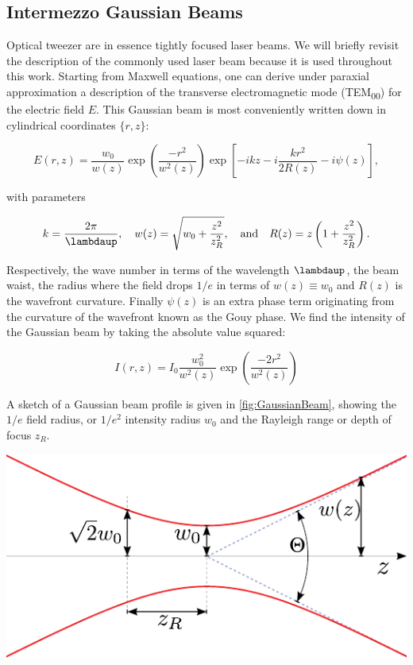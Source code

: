 \mbox{}\par
\begin{mdframed}
    \subsection*{Intermezzo Gaussian Beams}\label{sec:GaussianBeams}
    
    Optical tweezer are in essence tightly focused laser beams. We will briefly revisit the description of the commonly used laser beam because it is used throughout this work.
    Starting from Maxwell equations, one can derive under paraxial approximation a description of the transverse electromagnetic mode (TEM\textsubscript{00}) \cite{Leeuwen2017} for the electric field $E$.
    This Gaussian beam is most conveniently written down in cylindrical coordinates $\{r,z\}$:
    
    \begin{equation}\label{eq:GaussianBeam}
    	E(r,z) = \frac{w_0}{w(z)} \exp{\left(\frac{-r^2}{w^2(z)}\right)} \exp{\left[-ikz-i\frac{kr^2}{2R(z)} - i\psi(z)\right]},
    \end{equation}
    
    with parameters
    
    \begin{equation}\label{eq:GaussianBeamParameters}
    	k = \frac{2\pi}{\lambdaup}, \quad 
    	w(z) = \sqrt{w_0 + \frac{z^2}{z_R^2}}, \quad \text{and} \quad
    	R(z) = z \left(1 + \frac{z^2}{z_R^2}\right).
    \end{equation}
    
    Respectively, the wave number in terms of the wavelength $\lambdaup$, the beam waist, the radius where the field drops $1/e$ in terms of $w(z)\equiv w_0$ and $R(z)$ is the wavefront curvature. 
    Finally $\psi(z)$ is an extra phase term originating from the curvature of the wavefront known as the Gouy phase.
    We find the intensity of the Gaussian beam by taking the absolute value squared:
    
    \begin{equation}\label{eq:GaussianBeamIntensity}
    	I(r,z) = I_0 \frac{w_0^2}{w^2(z)} \exp{\left(\frac{-2r^2}{w^2(z)}\right)}
    \end{equation}
    
    A sketch of a Gaussian beam profile is given in \cref{fig:GaussianBeam}, showing the $1/e$ field radius, or $1/e^2$ intensity radius $w_0$ and the Rayleigh range or depth of focus $z_R$. 
    
    \vspace*{3mm}
    \centering
        \includegraphics[width=0.4\linewidth]{figures/GaussianBeam.pdf}
        \label{fig:GaussianBeam}
\end{mdframed}

